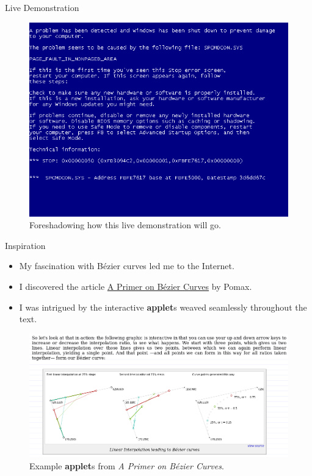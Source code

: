 \documentclass{beamer}
\begin{document}
\begin{frame}{Live Demonstration}
    \begin{figure}
        \begin{center}
            \includegraphics[scale=0.4]{images/bsod.png}
        \end{center}
        \caption{Foreshadowing how this live demonstration will go.}
    \end{figure}
\end{frame}

\begin{frame}{Inspiration}
    \begin{itemize}
        \item My fascination with Bézier curves led me to the Internet.
        \item I discovered the article
            \href{https://pomax.github.io/bezierinfo/}{A Primer on Bézier
            Curves} by Pomax.
        \item I was intrigued by the interactive \textbf{applet}s weaved
            seamlessly throughout the text.
    \end{itemize}
    \begin{figure}
        \begin{center}
            \includegraphics[scale=0.25]{images/pomax.png}
        \end{center}
        \caption{Example \textbf{applet}s from \textit{A Primer on Bézier
        Curves}.}
    \end{figure}
\end{frame}
\end{document}
